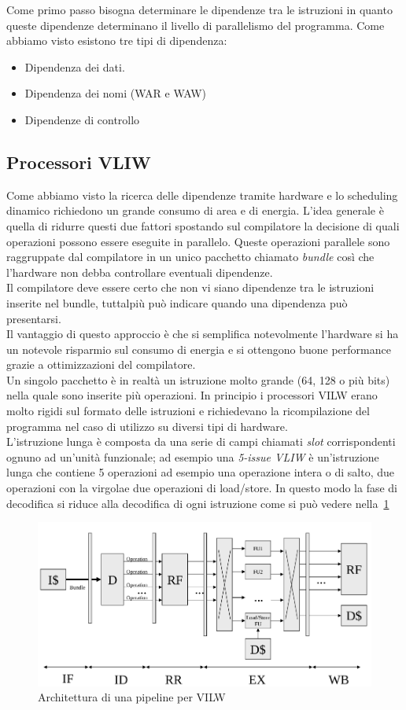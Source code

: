 Come primo passo bisogna determinare le dipendenze tra le istruzioni in quanto queste dipendenze determinano il livello di parallelismo del programma. Come abbiamo visto esistono tre tipi di dipendenza:
\begin{itemize}
\item Dipendenza dei dati.
\item Dipendenza dei nomi (WAR e WAW)
\item Dipendenze di controllo
\end{itemize}
\subsection{Processori VLIW}
Come abbiamo visto la ricerca delle dipendenze tramite hardware e lo scheduling dinamico richiedono un grande consumo di area e di energia. L'idea generale è quella di ridurre questi due fattori spostando sul compilatore la decisione di quali operazioni possono essere eseguite in parallelo. Queste operazioni parallele sono raggruppate dal compilatore in un unico pacchetto chiamato \emph{bundle} così che l'hardware non debba controllare eventuali dipendenze.\\
Il compilatore deve essere certo che non vi siano dipendenze tra le istruzioni inserite nel bundle, tuttalpiù può indicare quando una dipendenza può presentarsi.\\
Il vantaggio di questo approccio è che si semplifica notevolmente l'hardware si ha un notevole risparmio sul consumo di energia e si ottengono buone performance grazie a ottimizzazioni del compilatore.\\
Un singolo pacchetto è in realtà un istruzione molto grande (64, 128 o più bits) nella quale sono inserite più operazioni. In principio i processori VILW erano molto rigidi sul formato delle istruzioni e richiedevano la ricompilazione del programma nel caso di utilizzo su diversi tipi di hardware.\\
L'istruzione lunga è composta da una serie di campi chiamati \emph{slot} corrispondenti ognuno ad un'unità funzionale; ad esempio una \emph{5-issue VLIW} è un'istruzione lunga che contiene 5 operazioni ad esempio una operazione intera o di salto, due operazioni con la virgolae due operazioni di load/store. In questo modo la fase di decodifica si riduce alla decodifica di ogni istruzione come si può vedere nella \figurename\,\ref{fig:vliwarch}
\begin{figure}
\centering
\includegraphics[scale=0.5]{img/vliwarch.png}
\caption{Architettura di una pipeline per VILW}\label{fig:vliwarch}
\end{figure}